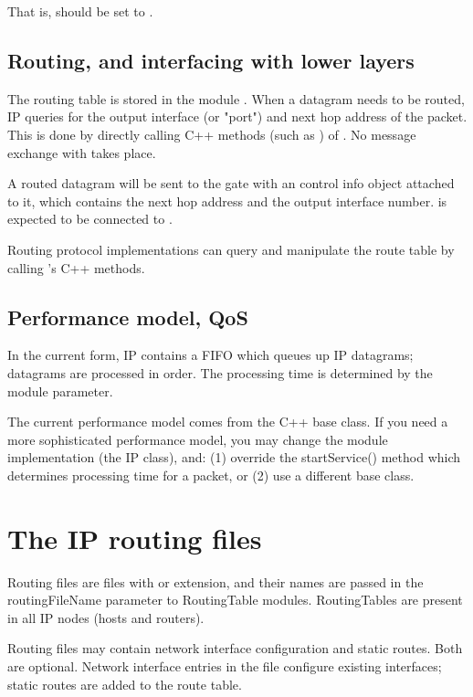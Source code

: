 That is,  should be set to .

\subsection{Routing, and interfacing with lower layers}

The routing table is stored in the module . When a
datagram needs to be routed, IP queries  for the
output interface (or "port") and next hop address of the packet. This is
done by directly calling C++ methods (such as
) of . No
message exchange with  takes place.

A routed datagram will be sent to the  gate with an
 control info object attached to it, which
contains the next hop address and the output interface number.
 is expected to be connected to .

Routing protocol implementations can query and manipulate the route table
by calling 's C++ methods.

\subsection{Performance model, QoS}

In the current form, IP contains a FIFO which queues up IP datagrams;
datagrams are processed in order. The processing time is determined by the
 module parameter.

The current performance model comes from the  C++ base
class. If you need a more sophisticated performance model, you may change
the module implementation (the IP class), and: (1) override the
startService() method which determines processing time for a packet, or (2)
use a different base class.


\section{The IP routing files}

Routing files are files with  or  extension,
and their names are passed in the routingFileName parameter
to RoutingTable modules. RoutingTables are present in all
IP nodes (hosts and routers).

Routing files may contain network interface configuration and static
routes. Both are optional. Network interface entries in the file
configure existing interfaces; static routes are added to the route table.

